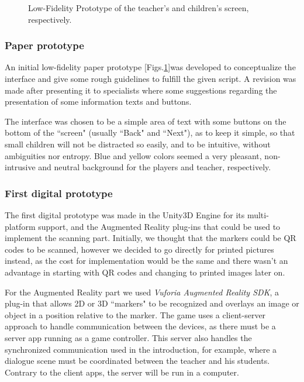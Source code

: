 \begin{figure}
    \caption{Low-Fidelity Prototype of the teacher's and children's screen, respectively.}
    \label{fig:LFP}
\end{figure}

\subsubsection{Paper prototype} An initial low-fidelity paper prototype [Figs.\ref{fig:LFP}]was developed to conceptualize the interface and give some rough guidelines to fulfill the given script. A revision was made after presenting it to specialists where some suggestions regarding the presentation of some information texts and buttons.
\par The interface was chosen to be a simple area of text with some buttons on the bottom of the ``screen" (usually ``Back" and ``Next"), as to keep it simple, so that small children will not be distracted so easily, and to be intuitive, without ambiguities nor entropy. Blue and yellow colors seemed a very pleasant, non-intrusive and neutral background for the players and teacher, respectively.


\subsubsection{First digital prototype} The first digital prototype was made in the Unity3D Engine for its multi-platform support, and the Augmented Reality plug-ins that could be used to implement the scanning part. Initially, we thought that the markers could be QR codes to be scanned, however we decided to go directly for printed pictures instead, as the cost for implementation would be the same and there wasn't an advantage in starting with QR codes and changing to printed images later on.
\par For the Augmented Reality part we used \textit{Vuforia Augmented Reality SDK}, a plug-in that allows 2D or 3D ``markers" to be recognized and overlays an image or object in a position relative to the marker. The game uses a client-server approach to handle communication between the devices, as there must be a server app running as a game controller. This server also handles the synchronized communication used in the introduction, for example, where a dialogue scene must be coordinated between the teacher and his students. Contrary to the client apps, the server will be run in a computer.


